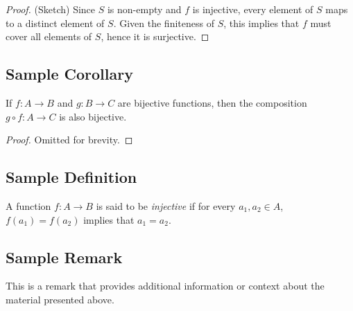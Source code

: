 \begin{proof}
(Sketch) Since \( S \) is non-empty and \( f \) is injective, every element of \( S \) maps to a distinct element of \( S \). Given the finiteness of \( S \), this implies that \( f \) must cover all elements of \( S \), hence it is surjective.
\end{proof}


\subsection{Sample Corollary}
\begin{corollary}
If \( f: A \to B \) and \( g: B \to C \) are bijective functions, then the composition \( g \circ f: A \to C \) is also bijective.
\end{corollary}

\begin{proof}
Omitted for brevity.
\end{proof}

\subsection{Sample Definition}
\begin{definition}
A function \( f: A \to B \) is said to be \emph{injective} if for every \( a_1, a_2 \in A \), \( f(a_1) = f(a_2) \) implies that \( a_1 = a_2 \).
\end{definition}

\subsection{Sample Remark}
\begin{remark}
This is a remark that provides additional information or context about the material presented above.
\end{remark}

